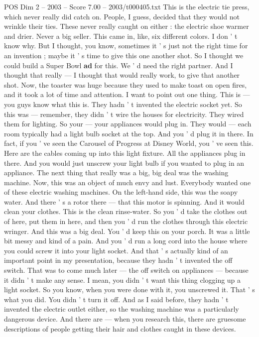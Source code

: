 \begin{textsample}{POS Dim 2 – 2003 – Score 7.00 – 2003/t000405.txt}
This is the electric tie press, which never really did catch on.
People, I guess, decided that they would not wrinkle their ties.
These never really caught on either : the electric shoe warmer and drier.
Never a big seller.
This came in, like, six different colors.
I don ' t know why.
But I thought, you know, sometimes it ' s just not the right time for an invention ; maybe it ' s time to give this one another shot.
So I thought we could build a Super Bowl \textbf{ad} for this.
We ' d need the right partner.
And I thought that really — I thought that would really work, to give that another shot.
Now, the toaster was huge because they used to make toast on open fires, and it took a lot of time and attention.
I want to point out one thing.
This is — you guys know what this is.
They hadn ' t invented the electric socket yet.
So this was — remember, they didn ' t wire the houses for electricity.
They wired them for lighting.
So your — your appliances would plug in.
They would — each room typically had a light bulb socket at the top.
And you ' d plug it in there.
In fact, if you ' ve seen the Carousel of Progress at Disney World, you ' ve seen this.
Here are the cables coming up into this light fixture.
All the appliances plug in there.
And you would just unscrew your light bulb if you wanted to plug in an appliance.
The next thing that really was a big, big deal was the washing machine.
Now, this was an object of much envy and lust.
Everybody wanted one of these electric washing machines.
On the left-hand side, this was the soapy water.
And there ' s a rotor there — that this motor is spinning.
And it would clean your clothes.
This is the clean rinse-water.
So you ' d take the clothes out of here, put them in here, and then you ' d run the clothes through this electric wringer.
And this was a big deal.
You ' d keep this on your porch.
It was a little bit messy and kind of a pain.
And you ' d run a long cord into the house where you could screw it into your light socket.
And that ' s actually kind of an important point in my presentation, because they hadn ' t invented the off switch.
That was to come much later — the off switch on appliances — because it didn ' t make any sense.
I mean, you didn ' t want this thing clogging up a light socket.
So you know, when you were done with it, you unscrewed it.
That ' s what you did.
You didn ' t turn it off.
And as I said before, they hadn ' t invented the electric outlet either, so the washing machine was a particularly dangerous device.
And there are — when you research this, there are gruesome descriptions of people getting their hair and clothes caught in these devices.

\end{textsample}
